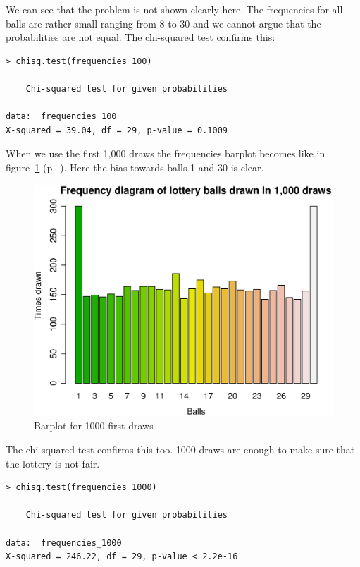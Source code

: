 \documentclass{article}
\begin{document}
\begin{enumerate}
  We can see that the problem is not shown clearly here. The frequencies for all
  balls are rather small ranging from 8 to 30 and we cannot argue that the
  probabilities are not equal. The chi-squared test confirms this:
  
  \begin{lstlisting}
> chisq.test(frequencies_100)

	Chi-squared test for given probabilities

data:  frequencies_100
X-squared = 39.04, df = 29, p-value = 0.1009
  \end{lstlisting}

  When we use the first 1,000 draws the frequencies barplot becomes like in
  figure~\ref{fig:barplot1000} (p.~\pageref{fig:barplot1000}). Here the bias
  towards balls 1 and 30 is clear.
  
  \begin{figure}[H]
  \centering
  \includegraphics[scale=0.6]{barplot1000.eps}
  \caption{Barplot for 1000 first draws}
  \label{fig:barplot1000}
  \end{figure}
  
  The chi-squared test confirms this too. 1000 draws are enough to make sure
  that the lottery is not fair.
  
  \begin{lstlisting}
> chisq.test(frequencies_1000)

	Chi-squared test for given probabilities

data:  frequencies_1000
X-squared = 246.22, df = 29, p-value < 2.2e-16
  \end{lstlisting}
  
  \end{enumerate}
\end{document}
